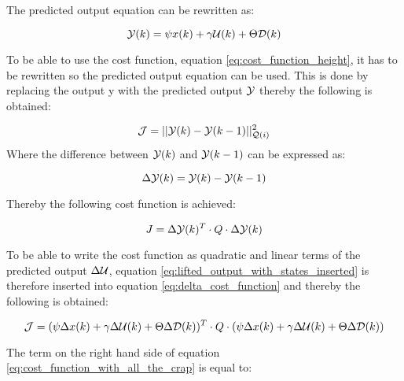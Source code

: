 The predicted output equation can be rewritten as: 

\begin{equation}\label{eq:lifted_output_with_states_inserted}
	\CMcal{Y}(k) = \psi x(k) + \gamma \CMcal{U}(k) + \Theta \CMcal{D}(k)
\end{equation}

To be able to use the cost function, equation \ref{eq:cost_function_height}, it has to be rewritten so the predicted output equation can be used. This is done by replacing the output y with the predicted output $\CMcal{Y}$ thereby the following is obtained:

\begin{equation}
	\CMcal{J} = ||\CMcal{Y}(k)-\CMcal{Y}(k-1)||_{\CMcal{Q}(i)}^2
\end{equation}
Where the difference between $\CMcal{Y}(k)$ and $\CMcal{Y}(k-1)$ can be expressed as:

\begin{equation}
	\Delta \CMcal{Y}(k) =\CMcal{Y}(k)-\CMcal{Y}(k-1) 
\end{equation}

Thereby the following cost function is achieved:

\begin{equation}\label{eq:delta_cost_function}
	J = \Delta\CMcal{Y}(k)^T \cdot Q \cdot \Delta\CMcal{Y}(k)
\end{equation}

To be able to write the cost function as quadratic and linear terms of the predicted output $\Delta\CMcal{U}$, equation \ref{eq:lifted_output_with_states_inserted} is therefore inserted into equation \ref{eq:delta_cost_function} and thereby the following is obtained:

\begin{equation}\label{eq:cost_function_with_all_the_crap}
	\CMcal{J} = (\psi\Delta x(k) + \gamma\Delta \CMcal{U}(k) + \Theta\Delta \CMcal{D}(k))^T\cdot Q \cdot (\psi\Delta x(k) + \gamma\Delta \CMcal{U}(k) + \Theta\Delta \CMcal{D}(k))
\end{equation}

The term on the right hand side of equation \ref{eq:cost_function_with_all_the_crap} is equal to:

